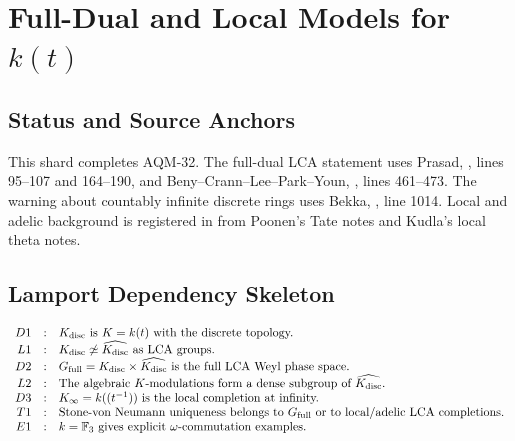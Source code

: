 
\section{Full-Dual and Local Models for \texorpdfstring{\(k(t)\)}{k(t)}}
\label{sec:full-dual-local-models-for-kt}

\subsection{Status and Source Anchors}

This shard completes AQM-32.  The full-dual LCA statement uses Prasad,
, lines
95--107 and 164--190, and Beny--Crann--Lee--Park--Youn,
,
lines 461--473.  The warning about countably infinite discrete rings uses
Bekka, ,
line 1014.  Local and adelic background is registered in
 from Poonen's Tate notes and
Kudla's local theta notes.

\subsection{Lamport Dependency Skeleton}

\[
\begin{array}{rcl}
D1&:&K_{\rm disc}\text{ is }K=k(t)\text{ with the discrete topology.}\\
L1&:&K_{\rm disc}\not\simeq\widehat{K_{\rm disc}}\text{ as LCA groups.}\\
D2&:&G_{\rm full}=K_{\rm disc}\times\widehat{K_{\rm disc}}\text{ is the full
      LCA Weyl phase space.}\\
L2&:&\text{The algebraic }K\text{-modulations form a dense subgroup of }
      \widehat{K_{\rm disc}}.\\
D3&:&K_\infty=k((t^{-1}))\text{ is the local completion at infinity.}\\
T1&:&\text{Stone-von Neumann uniqueness belongs to }G_{\rm full}\text{ or
      to local/adelic LCA completions.}\\
E1&:&k=\mathbb F_3\text{ gives explicit }\omega\text{-commutation examples.}
\end{array}
\]

